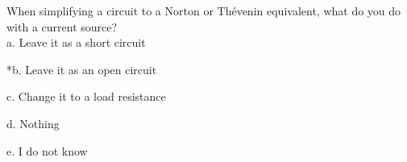 
When simplifying a circuit to a Norton or Thévenin equivalent, what do you do with a current source? \\

a. Leave it as a short circuit

*b. Leave it as an open circuit

c. Change it to a load resistance

d. Nothing

e. I do not know \\
